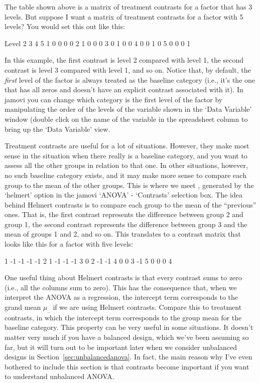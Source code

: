 The table shown above is a matrix of treatment contrasts for a factor that has 3 levels. But suppose I want a matrix of treatment contrasts for a factor with 5 levels? You would set this out like this:
\begin{rblock1}
Level   2 3 4 5
  1     0 0 0 0
  2     1 0 0 0
  3     0 1 0 0
  4     0 0 1 0
  5     0 0 0 1
\end{rblock1}
In this example, the first contrast is level 2 compared with level 1, the second contrast is level 3 compared with level 1, and so on. Notice that, by default, the {\it first} level of the factor is always treated as the baseline category (i.e., it's the one that has all zeros and doesn't have an explicit contrast associated with it). In jamovi you can change which category is the first level of the factor by manipulating the order of the levels of the variable shown in the `Data Variable' window (double click on the name of the variable in the spreadsheet column to bring up the `Data Variable' view. 


Treatment contrasts are useful for a lot of situations. However, they make most sense in the situation when there really is a baseline category, and you want to assess all the other groups in relation to that one. In other situations, however, no such baseline category exists, and it may make more sense to compare each group to the mean of the other groups. This is where we meet , generated by the `helmert' option in the jamovi `ANOVA' - `Contrasts' selection box. The idea behind Helmert contrasts is to compare each group to the mean of the ``previous'' ones. That is, the first contrast represents the difference between group 2 and group 1, the second contrast represents the difference between group 3 and the mean of groups 1 and 2, and so on. This translates to a contrast matrix that looks like this for a factor with five levels:
\begin{rblock1}
1   -1   -1   -1   -1
2    1   -1   -1   -1
3    0    2   -1   -1
4    0    0    3   -1
5    0    0    0    4
\end{rblock1}
One useful thing about Helmert contrasts is that every contrast sums to zero (i.e., all the columns sum to zero). This has the consequence that, when we interpret the ANOVA as a regression, the intercept term corresponds to the grand mean $\mu_{..}$ if we are using Helmert contrasts. Compare this to treatment contrasts, in which the intercept term corresponds to the group mean for the baseline category. This property can be very useful in some situations. It doesn't matter very much if you have a balanced design, which we've been assuming so far, but it will turn out to be important later when we consider unbalanced designs in Section~\ref{sec:unbalancedanova}. In fact, the main reason why I've even bothered to include this section is that contrasts become important if you want to understand unbalanced ANOVA.
 
